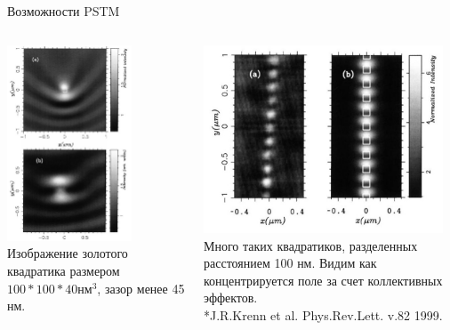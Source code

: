 \documentclass[9pt, compress, xcolor=table]{beamer}
\begin{document}
\begin{frame}{Возможности PSTM}
\begin{columns}[c]
\column{6.5cm}
\begin{center}
\includegraphics[width=0.7\textwidth]{nfm18}
\newline Изображение золотого квадратика размером $100*100*40 \text{нм}^3$, зазор менее 45 нм.
\end{center}

\column{6.5cm}
\begin{center}
\includegraphics[width=0.95\textwidth]{nfm16}
\newline Много таких квадратиков, разделенных расстоянием 100 нм. Видим как концентрируется поле за счет коллективных эффектов. \\*\colorbox{yellow!30}{\small{J.R.Krenn et al. Phys.Rev.Lett. v.82 1999.}}
\end{center}


\end{columns}
\end{frame}
\end{document}
